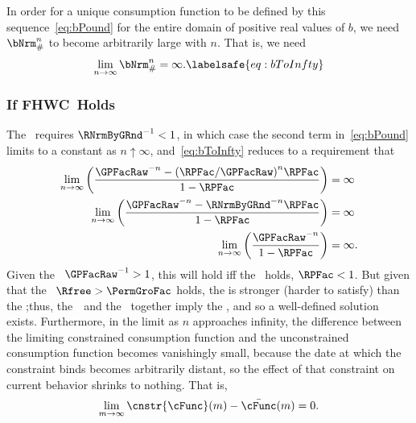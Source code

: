 \documentclass[\econtexRoot/BufferStockTheory]{subfiles}
\begin{document}
In order for a unique consumption function to be defined by this sequence~\eqref{eq:bPound} for the entire domain of positive real values of $b$, we need $\bNrm_{\#}^{n}$ to become arbitrarily large with $n$.
That is, we need
\begin{equation}\begin{gathered}\begin{aligned}
  \lim_{n \rightarrow \infty} \bNrm_{\#}^{n} = \infty. \labelsafe{eq:bToInfty}
\end{aligned}\end{gathered}\end{equation}

\subsubsection{If {FHWC}~Holds}
The \FHWC~requires $\RNrmByGRnd^{-1} < 1$, in which case the second term in~\eqref{eq:bPound} limits to a constant as $n \uparrow \infty$, and~\eqref{eq:bToInfty} reduces to a requirement that
\begin{eqnarray*}
  \lim_{n \rightarrow \infty} \left(\frac{\GPFacRaw^{-n}-{(\RPFac/\GPFacRaw)}^{n}\RPFac}{1-\RPFac}\right)  & = \infty
  \\  \lim_{n \rightarrow \infty} \left(\frac{\GPFacRaw^{-n}-\RNrmByGRnd^{-n}\RPFac}{1-\RPFac}\right)  & = \infty
  \\  \lim_{n \rightarrow \infty} \left(\frac{\GPFacRaw^{-n}}{1-\RPFac}\right)  & = \infty.
\end{eqnarray*}
Given the \GICRaw~$\GPFacRaw^{-1}>1$, this will hold iff the \RIC~holds, $\RPFac < 1$.
But given that the \FHWC~$\Rfree > \PermGroFac$ holds, the {\GICRaw} is stronger (harder to satisfy) than the \RIC;\@ thus, the~\FHWC~and the \GICRaw~together imply the \RIC, and so a well-defined solution exists.
Furthermore, in the limit as $n$ approaches infinity, the difference between the limiting constrained consumption function and the unconstrained consumption function becomes vanishingly small, because the date at which the constraint binds becomes arbitrarily distant, so the effect of that constraint on current behavior shrinks to nothing.
That is,
\begin{equation}\begin{gathered}\begin{aligned}
  \lim_{m \rightarrow \infty}\cnstr{\cFunc}(m) - \bar{\cFunc}(m) = 0.
\end{aligned}\end{gathered}\end{equation}
\end{document}
